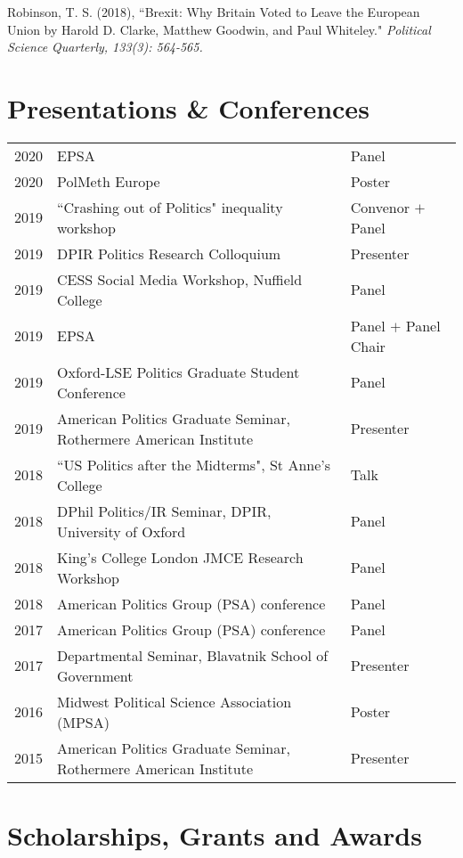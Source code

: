 \documentclass[11pt, a4paper]{article}
\begin{document}
  Robinson, T. S. (2018), ``Brexit: Why Britain Voted to Leave the European Union by Harold D. Clarke, Matthew Goodwin, and Paul Whiteley."\textit{ Political Science Quarterly, 133(3): 564-565.}

 \section*{Presentations \& Conferences}

 \begin{tabular}{lll}
 	 2020 & EPSA & Panel \\
     2020 & PolMeth Europe & Poster \\
     2019 & ``Crashing out of Politics" inequality workshop & Convenor $+$ Panel \\
     2019 & DPIR Politics Research Colloquium & Presenter \\
     2019 & CESS Social Media Workshop, Nuffield College & Panel \\
     2019 & EPSA  & Panel $+$ Panel Chair \\
     2019 & Oxford-LSE Politics Graduate Student Conference & Panel \\
     2019 & American Politics Graduate Seminar, Rothermere American Institute & Presenter \\
     2018 & ``US Politics after the Midterms", St Anne's College & Talk \\
     2018 & DPhil Politics/IR Seminar, DPIR, University of Oxford & Panel \\
     2018 & King's College London JMCE Research Workshop & Panel \\
     2018 & American Politics Group (PSA) conference & Panel \\
     2017 & American Politics Group (PSA) conference & Panel \\
     2017 & Departmental Seminar, Blavatnik School of Government & Presenter \\
     2016 & Midwest Political Science Association (MPSA) & Poster \\
     2015 & American Politics Graduate Seminar, Rothermere American Institute & Presenter
 \end{tabular}

 \section*{Scholarships, Grants and Awards}
\end{document}
